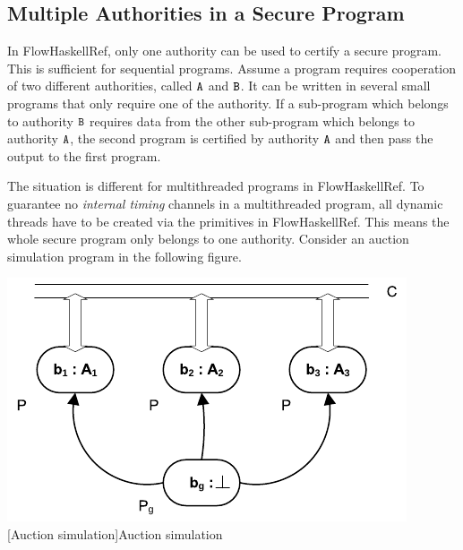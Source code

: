 \documentclass{report}
\newcommand{\co}[1]{$\cod{#1}$}
\begin{document}
\subsection{Multiple Authorities in a Secure Program}
In FlowHaskellRef, only one authority can be used to certify a secure program. This is sufficient for
sequential programs. Assume a program requires cooperation of two different authorities, 
called \co{A} and \co{B}. It can be written in several small programs that only require one of the authority.
If a sub-program which belongs to authority \co{B} requires data from the other sub-program which belongs to
authority \co{A}, the second program is certified by authority \co{A} and then pass the output to the
first program. 

The situation is different for multithreaded programs in FlowHaskellRef. To guarantee no {\em internal timing}
channels in a multithreaded program, all dynamic threads have to be created via the primitives in 
FlowHaskellRef. This means the whole secure program only belongs to one authority. Consider an auction simulation
program in the following figure. 

\begin{center}
\includegraphics[scale=0.9]{bidder.pdf} \\
[Auction simulation]{Auction simulation}
\end{center}
\end{document}
